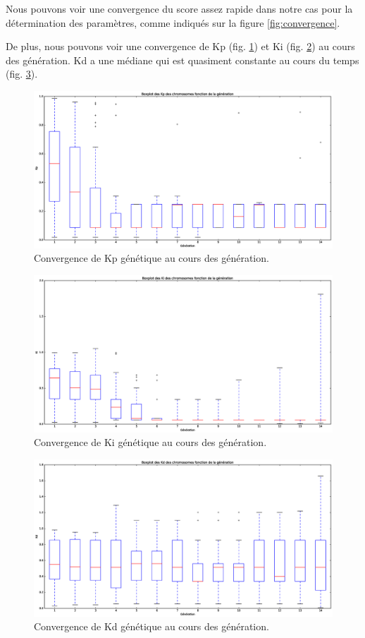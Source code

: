\documentclass[a4paper,10pt]{report}
\begin{document}
Nous pouvons voir une convergence du score assez rapide dans notre cas pour la détermination des paramètres, comme indiqués sur la figure \ref{fig:convergence}.


De plus, nous pouvons voir une convergence de Kp (fig. \ref{fig:kpbox}) et Ki (fig. \ref{fig:kibox}) au cours des génération. Kd a une médiane qui est quasiment constante au cours du temps (fig. \ref{fig:kdbox}).

\begin{figure}[hb!]
   \centering
   \includegraphics[scale=0.35]{KpBoxplot.eps}
    \caption{\label{fig:kpbox} Convergence de Kp génétique au cours des génération.}
\end{figure}
\begin{figure}[hb!]
   \centering
   \includegraphics[scale=0.35]{KiBoxplot.eps}
    \caption{\label{fig:kibox} Convergence de Ki génétique au cours des génération.}
\end{figure}
\begin{figure}[hb!]
   \centering
   \includegraphics[scale=0.35]{KdBoxplot.eps}
    \caption{\label{fig:kdbox} Convergence de Kd génétique au cours des génération.}
\end{figure}
\end{document}
